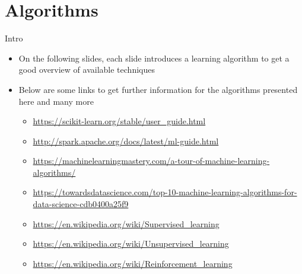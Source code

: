 



\section{Algorithms}
  \begin{frame}{Intro}
    \begin{itemize}
      \item On the following slides, each slide introduces a learning algorithm to get a good overview of available techniques
      \item Below are some links to get further information for the algorithms presented here and many more
      \begin{itemize}
        \item \url{https://scikit-learn.org/stable/user_guide.html}
        \item \url{http://spark.apache.org/docs/latest/ml-guide.html}
        \item \url{https://machinelearningmastery.com/a-tour-of-machine-learning-algorithms/}
        \item \url{https://towardsdatascience.com/top-10-machine-learning-algorithms-for-data-science-cdb0400a25f9}
        \item \url{https://en.wikipedia.org/wiki/Supervised_learning}
        \item \url{https://en.wikipedia.org/wiki/Unsupervised_learning}
        \item \url{https://en.wikipedia.org/wiki/Reinforcement_learning}
      \end{itemize}
    \end{itemize}
  \end{frame}

